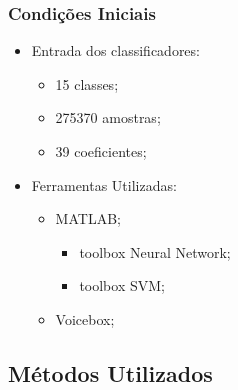 \documentclass{beamer}
\begin{document}
\begin{frame}
	\frametitle{Condições Iniciais}
	
    \begin{itemize}
    	\setlength\itemsep{1em}
    	\item Entrada dos classificadores:
        \begin{itemize}
    	    \item 15 classes;
            \item 275370 amostras;
            \item 39 coeficientes;
        \end{itemize}
    	
        \item Ferramentas Utilizadas:
        \begin{itemize}
			\item MATLAB;
        	\begin{itemize}
        		\item toolbox Neural Network;
        		\item toolbox SVM;
        	\end{itemize}
        	\item Voicebox;
		\end{itemize}
	\end{itemize}
\end{frame}




\subsection{Métodos Utilizados}
\end{document}
